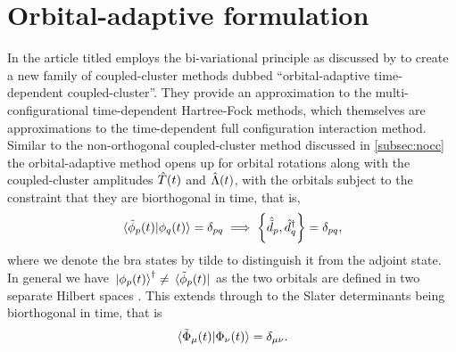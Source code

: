     \section{Orbital-adaptive formulation}
        \label{sec:oatdcc}
        In the article titled 
        \citeauthor{kvaal2012ab} \cite{kvaal2012ab} employs the
        bi-variational principle as discussed by \citeauthor{arponen1983311}
        \cite{arponen1983311} to create a new family of coupled-cluster
        methods dubbed ``orbital-adaptive time-dependent
        coupled-cluster''.
        They provide an approximation to the multi-configurational
        time-dependent Hartree-Fock methods, which themselves are
        approximations to the time-dependent full configuration interaction
        method.
        Similar to the non-orthogonal coupled-cluster method discussed in
        \autoref{subsec:nocc} the orbital-adaptive method opens up for
        orbital rotations along with the coupled-cluster amplitudes
        $\hat{T}(t)$ and $\hat{\Lambda}(t)$, with the orbitals subject to the
        constraint that they are biorthogonal in time, that is,
        \begin{align}
            \braket*{\tilde{\phi}_p(t)}{\phi_q(t)} = \delta_{pq}
            \implies
            \left\{\hat{\tilde{d}}_{p}, \hat{d}^{\dagger}_{q}\right\}
            = \delta_{pq},
        \end{align}
        where we denote the bra states by tilde to distinguish it from the
        adjoint state.
        In general we have $\ket*{\phi_p(t)}^{\dagger} \neq
        \bra*{\tilde{\phi}_p(t)}$ as the two orbitals are defined in two
        separate Hilbert spaces \cite{kvaal2012ab}.
        This extends through to the Slater determinants being biorthogonal
        in time, that is
        \begin{align}
            \braket*{\tilde{\Phi}_{\mu}(t)}{\Phi_{\nu}(t)}
            = \delta_{\mu\nu}.
        \end{align}

